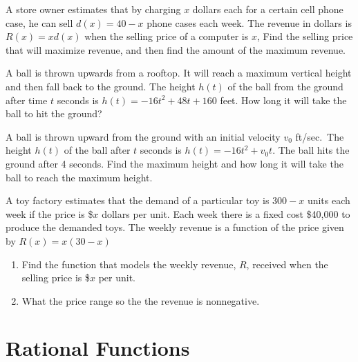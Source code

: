 \documentclass[en,11pt]{elegantbook}
\let\BeginKnitrBlock\begin \let\EndKnitrBlock\end
\begin{document}
\BeginKnitrBlock{exercise}
\protect\hypertarget{exr:unnamed-chunk-267}{}{\label{exr:unnamed-chunk-267} }
A store owner estimates that by charging \(x\) dollars each for a certain cell phone case, he can sell \(d(x)=40 - x\) phone cases each week. The revenue in dollars is \(R(x)=xd(x)\) when the selling price of a computer is \(x\), Find the selling price that will maximize revenue, and then find the amount of the maximum revenue.
\EndKnitrBlock{exercise}

\BeginKnitrBlock{exercise}
\protect\hypertarget{exr:unnamed-chunk-268}{}{\label{exr:unnamed-chunk-268} }
A ball is thrown upwards from a rooftop. It will reach a maximum vertical height and then fall back to the ground. The height \(h(t)\) of the ball from the ground after time \(t\) seconds is \(h(t)=-16t^2 + 48t + 160\) feet. How long it will take the ball to hit the ground?
\EndKnitrBlock{exercise}

\BeginKnitrBlock{exercise}
\protect\hypertarget{exr:unnamed-chunk-269}{}{\label{exr:unnamed-chunk-269} }
A ball is thrown upward from the ground with an initial velocity \(v_0\) ft/sec.~The height \(h(t)\) of the ball after \(t\) seconds is \(h(t)= -16t^2 + v_0t\). The ball hits the ground after 4 seconds.
Find the maximum height and how long it will take the ball to reach the maximum height.
\EndKnitrBlock{exercise}

\BeginKnitrBlock{exercise}
\protect\hypertarget{exr:unnamed-chunk-270}{}{\label{exr:unnamed-chunk-270} }
A toy factory estimates that the demand of a particular toy is \(300 -x\) units each week if the price is \$\(x\) dollars per unit. Each week there is a fixed cost \$40,000 to produce the demanded toys.
The weekly revenue is a function of the price given by \(R(x)=x(30-x)\)

\begin{enumerate}
\def\labelenumi{\arabic{enumi}.}

\item
  Find the function that models the weekly revenue, \(R\), received when the selling price is \$\(x\) per unit.
\item
  What the price range so the the revenue is nonnegative.
\end{enumerate}
\EndKnitrBlock{exercise}

\hypertarget{rational-functions}{%
\chapter{Rational Functions}\label{rational-functions}}
\end{document}
